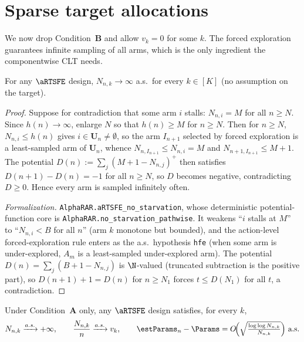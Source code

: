 \section{Sparse target allocations}
\label{sec:forced_sparse}

We now drop Condition~\textbf{B} and allow $v_k=0$ for some $k$. The forced
exploration guarantees infinite sampling of all arms, which is the only
ingredient the componentwise CLT needs.

\begin{lemma}\label{lem:fe_no_starvation}
\leanok
{}
For any $\aRTSFE$ design, $N_{n,k}\to\infty$ a.s.\ for every $k\in[K]$ (no
assumption on the target).
\end{lemma}

\begin{proof}
Suppose for contradiction that some arm $i$ stalls: $N_{n,i}=M$ for all $n\ge N$.
Since $h(n)\to\infty$, enlarge $N$ so that $h(n)\ge M$ for $n\ge N$. Then for
$n\ge N$, $N_{n,i}\le h(n)$ gives $i\in\mathbf{U}_n\ne\emptyset$, so the arm
$I_{n+1}$ selected by forced exploration is a least-sampled arm of $\mathbf{U}_n$,
whence $N_{n,I_{n+1}}\le N_{n,i}=M$ and $N_{n+1,I_{n+1}}\le M+1$. The potential
$D(n):=\sum_j (M+1-N_{n,j})^+$ then satisfies $D(n+1)-D(n)=-1$ for all $n\ge N$,
so $D$ becomes negative, contradicting $D\ge0$. Hence every arm is sampled
infinitely often.

\emph{Formalization.} \texttt{AlphaRAR.aRTSFE\_no\_starvation}, whose deterministic potential-function
core is \texttt{AlphaRAR.no\_starvation\_pathwise}. It weakens ``$i$ stalls at $M$'' to ``$N_{n,i}<B$
for all $n$'' (arm $k$ monotone but bounded), and the action-level forced-exploration rule enters as
the a.s.\ hypothesis \texttt{hfe} (when some arm is under-explored, $A_m$ is a least-sampled
under-explored arm). The potential $D(n)=\sum_j(B+1-N_{n,j})$ is $\N$-valued (truncated subtraction is
the positive part), so $D(n+1)+1=D(n)$ for $n\ge N_1$ forces $t\le D(N_1)$ for all $t$, a contradiction.
\end{proof}

\begin{theorem}\label{thm:sparse_rate}
\leanok
{}
Under Condition~\textbf{A} only, any $\aRTSFE$ design satisfies, for every $k$,
\[
  N_{n,k}\xrightarrow{a.s.}+\infty,\qquad
  \frac{N_{n,k}}{n}\xrightarrow{a.s.}v_k,\qquad
  \estParams_n-\Params = O\!\Big(\sqrt{\tfrac{\log\log N_{n,k}}{N_{n,k}}}\Big)\ \text{a.s.}
\]
\end{theorem}

